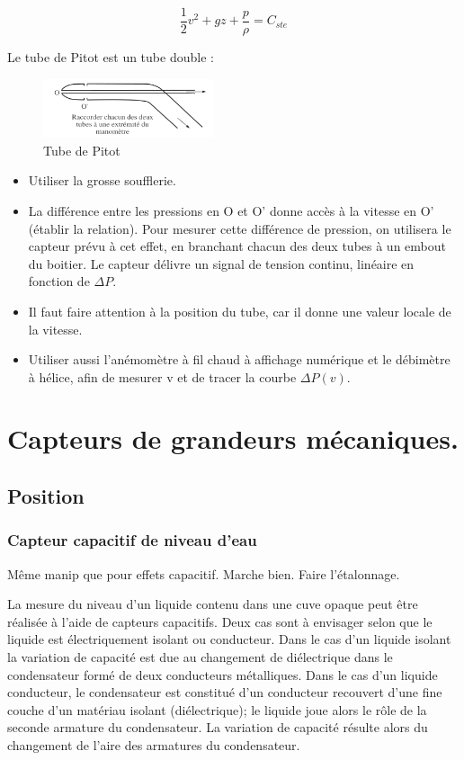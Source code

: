 \documentclass{article}%
\begin{document}
\[ \frac{1}{2} v^{2 } + g z + \frac{p}{\rho} = C_{ste}\]

Le tube de Pitot est un tube double : 
\begin{figure}
	\centerline{\includegraphics[width=5cm]{images-exp/Pitot.png}}
	\caption{Tube de Pitot}
\end{figure}
\begin{itemize}
\item Utiliser la grosse soufflerie.
\item La différence entre les pressions en O et O' donne accès à la vitesse en O' (établir la relation). Pour mesurer cette différence de pression, on utilisera le capteur prévu à cet effet, en branchant chacun des deux tubes à un embout du boitier. Le capteur délivre un signal de tension continu, linéaire en fonction de $\Delta P$.
\item Il faut faire attention à la position du tube, car il donne une valeur locale de la vitesse.
\item Utiliser aussi l'anémomètre à fil chaud à affichage numérique et le débimètre à hélice, afin de mesurer v et de tracer la courbe $\Delta P(v)$.
\end{itemize}

\section{Capteurs de grandeurs mécaniques.}
\subsection{Position}
\subsubsection{Capteur capacitif de niveau d'eau}
Même manip que pour effets capacitif. Marche bien. Faire l'étalonnage.

La mesure du niveau d'un liquide contenu dans une cuve opaque peut être réalisée à l'aide de capteurs capacitifs. Deux cas sont à envisager selon que le liquide est électriquement isolant ou conducteur. Dans le cas d'un liquide isolant la variation de capacité est due au changement de diélectrique dans le condensateur formé de deux conducteurs métalliques. Dans le cas d'un liquide conducteur, le condensateur est constitué d'un conducteur recouvert d'une fine couche d'un matériau isolant (diélectrique); le liquide joue alors le rôle de la seconde armature du condensateur. La variation de capacité résulte alors du changement de l'aire des armatures du condensateur.
\end{document}
